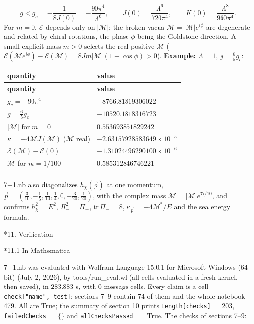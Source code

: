 \documentclass[10pt,a4paper]{article}
\makeatletter
\renewcommand\section{\@startsection{section}{1}{\z@}{-3.5ex \@plus -1ex \@minus -.2ex}{2.3ex \@plus.2ex}{\normalfont\Large\bfseries\raggedright}}
\renewcommand\subsection{\@startsection{subsection}{2}{\z@}{-3.25ex\@plus -1ex \@minus -.2ex}{1.5ex \@plus .2ex}{\normalfont\large\bfseries\raggedright}}
\makeatother
\begin{document}
\begin{equation*}
g<g_c=-\frac{1}{8J(0)}=-\frac{90\pi^4}{\Lambda^6},\qquad J(0)=\frac{\Lambda^6}{720\pi^4},\qquad K(0)=\frac{\Lambda^8}{960\pi^4}.
\end{equation*}
For $m=0$, $\mathcal E$ depends only on $|\mathcal M|$: the broken vacua $\mathcal M=|\mathcal M|e^{i\phi}$ are degenerate and related by chiral rotations, the phase $\phi$ being the Goldstone direction. A small explicit mass $m>0$ selects the real positive $\mathcal M$ ($\mathcal E(\mathcal Me^{i\phi})-\mathcal E(\mathcal M)=8Jm|\mathcal M|(1-\cos\phi)>0$). \textbf{Example:} $\Lambda=1$, $g=\frac65g_c$:

{\small
\begin{longtable}{>{\raggedright\arraybackslash}p{}>{\raggedright\arraybackslash}p{}}
\toprule
\textbf{quantity} & \textbf{value} \\
\midrule\endfirsthead
\toprule
\textbf{quantity} & \textbf{value} \\
\midrule\endhead
\endfoot
\bottomrule\endlastfoot
$g_c=-90\pi^4$ & $-8766.81819306022$ \\
$g=\frac65g_c$ & $-10520.1818316723$ \\
$|\mathcal M|$ for $m=0$ & $0.553693851829242$ \\
$\kappa=-4\mathcal MJ(\mathcal M)$ ($\mathcal M$ real) & $-2.63157928583649\times10^{-5}$ \\
$\mathcal E(\mathcal M)-\mathcal E(0)$ & $-1.31024496290100\times10^{-6}$ \\
$\mathcal M$ for $m=1/100$ & $0.585312846746221$ \\*
\end{longtable}}
7+1.nb also diagonalizes $h_\chi(\vec p)$ at one momentum, $\vec p=(\frac3{10},-\frac15,\frac1{10},\frac14,0,-\frac3{20},\frac1{20})$, with the complex mass $\mathcal M=|\mathcal M|e^{7i/10}$, and confirms $h_\chi^2=E^2$, $\Pi_-^2=\Pi_-$, $\mathrm{tr}\,\Pi_-=8$, $\kappa_{\vec p}=-4\mathcal M^*/E$ and the sea energy formula.

\section*{11. Verification}
\subsection*{11.1 In Mathematica}
7+1.nb was evaluated with Wolfram Language 15.0.1 for Microsoft Windows (64-bit) (July 2, 2026), by tools/run\_eval.wl (all cells evaluated in a fresh kernel, then saved), in 283.883 s, with 0 message cells. Every claim is a cell \texttt{check["name", test]}; sections 7–9 contain 74 of them and the whole notebook 479. All are True; the summary of section 10 prints \texttt{Length[checks]} $=203$, \texttt{failedChecks} $=\lbrace\rbrace$ and \texttt{allChecksPassed} $=$ True. The checks of sections 7–9:
\end{document}
